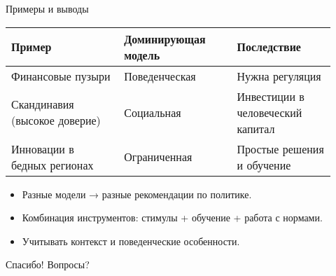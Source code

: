 \documentclass[aspectratio=169]{beamer}
\begin{document}
\begin{frame}{Примеры и выводы}
\centering
\begin{tabular}{p{0.32\linewidth} p{0.32\linewidth} p{0.28\linewidth}}
\toprule
Пример & Доминирующая модель & Последствие \\
\midrule
Финансовые пузыри & Поведенческая & Нужна регуляция \\
Скандинавия (высокое доверие) & Социальная & Инвестиции в человеческий капитал \\
Инновации в бедных регионах & Ограниченная & Простые решения и обучение \\
\bottomrule
\end{tabular}

\vspace{4mm}
\begin{itemize}
  \item Разные модели → разные рекомендации по политике.
  \item Комбинация инструментов: стимулы + обучение + работа с нормами.
  \item Учитывать контекст и поведенческие особенности.
\end{itemize}
\end{frame}

\begin{frame}{Спасибо!}
\centering
Вопросы?
\end{frame}
\end{document}
